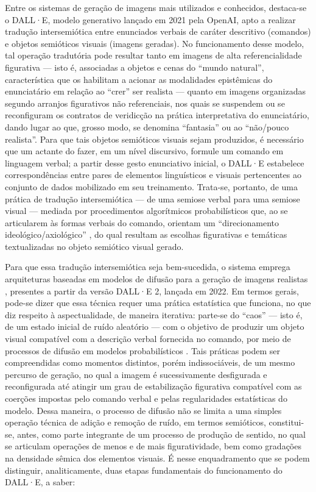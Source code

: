 \documentclass[portuguese]{textolivre}
\begin{document}
Entre os sistemas de geração de imagens mais utilizados e conhecidos, destaca-se o DALL·E, modelo generativo lançado em 2021 pela OpenAI, apto a realizar tradução intersemiótica entre enunciados verbais de caráter descritivo (comandos) e objetos semióticos visuais (imagens geradas). No funcionamento desse modelo, tal operação tradutória pode resultar tanto em imagens de alta referencialidade figurativa — isto é, associadas a objetos e cenas do “mundo natural”, característica que os habilitam a acionar as modalidades epistêmicas \cite[p.~172]{greimas2008dicionario} do enunciatário em relação ao “crer” ser realista — quanto em imagens organizadas segundo arranjos figurativos não referenciais, nos quais se suspendem ou se reconfiguram os contratos de veridicção na prática interpretativa do enunciatário, dando lugar ao que, grosso modo, se denomina “fantasia” ou ao “não/pouco realista”. Para que tais objetos semióticos visuais sejam produzidos, é necessário que um actante do fazer, em um nível discursivo, formule um comando em linguagem verbal; a partir desse gesto enunciativo inicial, o DALL·E estabelece correspondências entre pares de elementos linguísticos e visuais pertencentes ao conjunto de dados mobilizado em seu treinamento. Trata-se, portanto, de uma prática de tradução intersemiótica — de uma semiose verbal para uma semiose visual — mediada por procedimentos algorítmicos probabilísticos que, ao se articularem às formas verbais do comando, orientam um “direcionamento ideológico/axiológico” \cite{mancini2020tensao}, do qual resultam as escolhas figurativas e temáticas textualizadas no objeto semiótico visual gerado.

Para que essa tradução intersemiótica seja bem-sucedida, o sistema emprega arquiteturas baseadas em modelos de difusão para a geração de imagens realistas \cite{saharia2022photorealistic}, presentes a partir da versão DALL·E 2, lançada em 2022. Em termos gerais, pode-se dizer que essa técnica requer uma prática estatística que funciona, no que diz respeito à aspectualidade, de maneira iterativa: parte-se do “caos” — isto é, de um estado inicial de ruído aleatório — com o objetivo de produzir um objeto visual compatível com a descrição verbal fornecida no comando, por meio de processos de difusão em modelos probabilísticos \cite{darmenio2025semiotic}. Tais práticas podem ser compreendidas como momentos distintos, porém indissociáveis, de um mesmo percurso de geração, no qual a imagem é sucessivamente desfigurada e reconfigurada até atingir um grau de estabilização figurativa compatível com as coerções impostas pelo comando verbal e pelas regularidades estatísticas do modelo. Dessa maneira, o processo de difusão não se limita a uma simples operação técnica de adição e remoção de ruído, em termos semióticos, constitui-se, antes, como parte integrante de um processo de produção de sentido, no qual se articulam operações de menos e de mais figuratividade, bem como gradações na densidade sêmica dos elementos visuais. É nesse enquadramento que se podem distinguir, analiticamente, duas etapas fundamentais do funcionamento do DALL·E, a saber:
\end{document}
